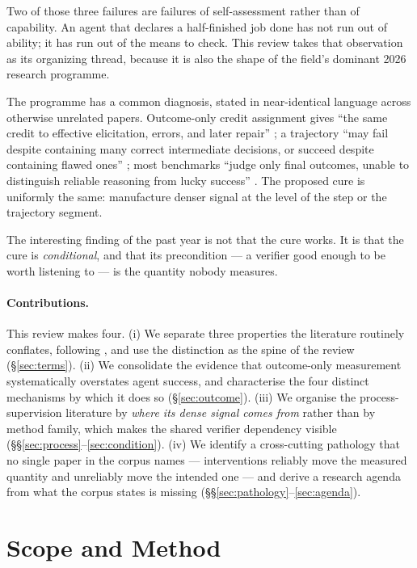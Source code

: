 \documentclass[10pt,twocolumn,a4paper]{article}
\begin{document}
Two of those three failures are failures of self-assessment rather than of capability.
An agent that declares a half-finished job done has not run out of ability; it has run out
of the means to check.
This review takes that observation as its organizing thread, because it is also the shape
of the field's dominant 2026 research programme.

The programme has a common diagnosis, stated in near-identical language across
otherwise unrelated papers.
Outcome-only credit assignment gives ``the same credit to effective elicitation, errors,
and later repair'' \citep{zhao2026betteragentsmultiturnuser}; a trajectory ``may fail
despite containing many correct intermediate decisions, or succeed despite containing
flawed ones'' \citep{yuan2026verifiableprocessrewardsagentic}; most benchmarks ``judge only
final outcomes, unable to distinguish reliable reasoning from lucky success''
\citep{wu2026clawtracktracelevelevaluationimprovement}.
The proposed cure is uniformly the same: manufacture denser signal at the level of the
step or the trajectory segment.

The interesting finding of the past year is not that the cure works.
It is that the cure is \emph{conditional}, and that its precondition --- a verifier good
enough to be worth listening to --- is the quantity nobody measures.

\paragraph{Contributions.}
This review makes four.
(i) We separate three properties the literature routinely conflates, following
\citet{chen2026horizongapplanningmemory}, and use the distinction as the spine of the
review (\S\ref{sec:terms}).
(ii) We consolidate the evidence that outcome-only measurement systematically overstates
agent success, and characterise the four distinct mechanisms by which it does so
(\S\ref{sec:outcome}).
(iii) We organise the process-supervision literature by \emph{where its dense signal comes
from} rather than by method family, which makes the shared verifier dependency visible
(\S\S\ref{sec:process}--\ref{sec:condition}).
(iv) We identify a cross-cutting pathology that no single paper in the corpus names ---
interventions reliably move the measured quantity and unreliably move the intended one ---
and derive a research agenda from what the corpus states is missing
(\S\S\ref{sec:pathology}--\ref{sec:agenda}).

\section{Scope and Method}
\label{sec:scope}
\end{document}
